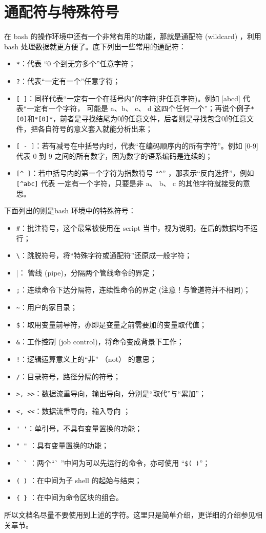 \section{通配符与特殊符号}
在 bash 的操作环境中还有一个非常有用的功能，那就是通配符 (wildcard) ，利用 bash 处理数据就更方便了。底下列出一些常用的通配符：
\begin{itemize}
\item \verb|*|：代表 “0 个到无穷多个”任意字符；

\item \verb|?|：代表“一定有一个”任意字符；

\item \verb|[ ]|：同样代表“一定有一个在括号内”的字符(非任意字符)。例如 [abcd] 代表“一定有一个字符， 可能是 a、b、 c、 d 这四个任何一个”；再说个例子\verb|*[0]|和\verb|*[0]*|，前者是寻找结尾为0的任意文件，后者则是寻找包含0的任意文件，把各自符号的意义套入就能分析出来；

\item \verb|[ - ]|：若有减号在中括号内时，代表“在编码顺序内的所有字符”。例如 [0-9] 代表 0 到 9 之间的所有数字，因为数字的语系编码是连续的；

\item \verb|[^ ]|：若中括号内的第一个字符为指数符号 “\verb|^|” ，那表示“反向选择”，例如 \verb|[^abc]| 代表 一定有一个字符，只要是非 a、 b、 c 的其他字符就接受的意思。
\end{itemize}

下面列出的则是bash 环境中的特殊符号：
\begin{itemize}
\item \verb|#|：批注符号，这个最常被使用在 script 当中，视为说明，在后的数据均不运行；
\item \verb|\|：跳脱符号，将“特殊字符或通配符”还原成一般字符；
\item\verb|||：	管线 (pipe)，分隔两个管线命令的界定；
\item \verb|;|：连续命令下达分隔符，连续性命令的界定 (注意！与管道符并不相同)；
\item \verb|~|：用户的家目录；
\item \verb|$|：取用变量前导符，亦即是变量之前需要加的变量取代值；
\item \verb|&|：工作控制 (job control)，将命令变成背景下工作；
\item \verb|!|：逻辑运算意义上的“非” （not） 的意思；
\item \verb|/|：目录符号，路径分隔的符号；
\item \verb|>, >>|：数据流重导向，输出导向，分别是“取代”与“累加”；
\item \verb|<, <<|：数据流重导向，输入导向 ；
\item \verb|' '|：单引号，不具有变量置换的功能；
\item \verb|" "|	：具有变量置换的功能；
\item \verb|` `|	：两个“\verb|`| ”中间为可以先运行的命令，亦可使用 “\verb|$( )|”；
\item \verb|( )|	：在中间为子 shell 的起始与结束；
\item \verb|{ }|	：在中间为命令区块的组合。
\end{itemize}
所以文档名尽量不要使用到上述的字符。这里只是简单介绍，更详细的介绍参见相关章节。


